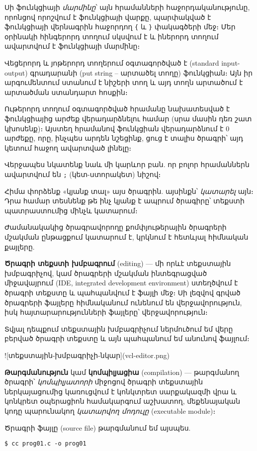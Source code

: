 Սի ֆունկցիայի \emph{մարմինը}՝ այն հրամանների հաջորդականությունը,
որոնցով որոշվում է ֆունկցիայի վարքը, պարփակված է ֆունկցիայի
վերնագրին հաջոր\-դող \Verb|{| և \Verb|}| փակագծերի մեջ։ Մեր
օրինակի հինգերորդ տողում սկսվում է և իներորդ տողում ավարտվում է
 ֆունկցիայի մարմինը։

Վեցերորդ և յոթերորդ տողերում օգտագործված է 
(standard input-output) գրադարանի 
(put string -- արտածել տողը) ֆունկցիան։ Այն իր արգումեն\-տում
ստանում է նիշերի տող և այդ տողն արտածում է 
արտածման ստան\-դարտ հոսքին։

Ութերորդ տողում օգտագործված  հրամանը
նախատեսված է ֆունկ\-ցիայից արժեք վերադարձնելու համար (սրա մասին
դեռ շատ կխոսենք)։ Այստեղ  հրամանով  ֆունկցիան
վերադարձնում է \(0\) արժեքը, որը, ինչպես արդեն նշեցինք, ցուց է
տալիս ծրագրի՝ այդ կետում հաջող ավարտված լինելը։

Վերջապես նկատենք նաև մի կարևոր բան. որ բոլոր հրամաններն ավարտվում
են \verb|;| (կետ-ստորակետ) նիշով։

Հիմա փորձենք «կյանք տալ» այս ծրագրին. այսինքն՝ \emph{կատարել} այն։
Դրա համար տեսնենք թե ինչ կյանք է ապրում ծրագիրը՝ տեքստի պատրաստումից
մինչև կատարում։

Ժամանակակից ծրագրավորողը քոմփյութերային ծրագրերի մշակման ընթաց\-քում
կատարում է, կրկնում է հետևյալ հիմնական քայլերը.

\textbf{Ծրագրի տեքստի խմբագրում} (editing) --- մի որևէ տեքստային
խմբագրիչով, կամ ծրագրերի մշակման ինտեգրացված միջավայրում (IDE,
integrated development environment) ստեղծվում է ծրագրի տեքստը և
պահպանվում է ֆայլի մեջ։ Սի լեզվով գրված ծրագրերի ֆայլերը հիմնականում
ունենում են  վերջավորութ\-յուն, իսկ հայտարարությունների
ֆայլերը՝  վերջավորություն։

Տվյալ դեպքում տեքստային խմբագրիչում ներմուծում եմ վերը բերված ծրագրի
տեքստը և այն պահպանում եմ  անունով ֆայլում։

![տեքստային-խմբագրիչի-նկար](vcl-editor.png)

\textbf{Թարգմանություն} կամ \textbf{կոմպիլյացիա} (compilation) ---
թարգմանող ծրագրի՝ \emph{կոմպիլյատորի} միջոցով ծրագրի տեքստային
ներկայացումից կառուցվում է կոնկտրետ սարքակազմի վրա և կոնկրետ
օպերացիոն համակարգում աշխատող, մեքենայական կոդը պարունակող
\emph{կատարվող մոդուլը} (executable module)։

Ծրագրի  ֆայլը (source file) թարգմանում եմ այսպես.

\begin{Verbatim}
$ cc prog01.c -o prog01
\end{Verbatim}

